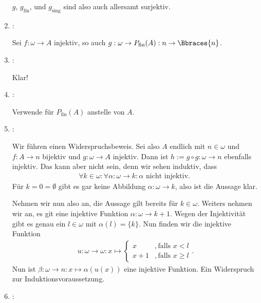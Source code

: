 \begin{solution}
\begin{enumerate}[label = \texttt{ad}]
	$g$, $g_\mathrm{fin}$, und $g_\mathrm{sing}$ sind also auch allersamt surjektiv.
	
	\item {}:
	
	Sei $f: \omega \to A$ injektiv, so auch $g: \omega \to P_\mathrm{fin}(A): n \to \Bbraces{n}$.
	
	\item {}:
	
	Klar!
	
	\item {}:
	
	Verwende  für $P_\mathrm{fin}(A)$ anstelle von $A$.
	
	\item {}:
	
	Wir führen einen Widerspruchsbeweis. Sei also $A$ endlich mit $n \in \omega$ und $f: A \to n$ bijektiv und $g: \omega \to A$ injektiv. Dann ist $h:= g \circ g: \omega \to n$ ebenfalls injektiv. Das kann aber nicht sein, denn wir sehen induktiv, dass
	\begin{align*}
		\forall k \in \omega: \forall \alpha: \omega \to k: \alpha \text{ nicht injektiv. }
	\end{align*}
	Für $k = 0 = \emptyset$ gibt es gar keine Abbildung $\alpha: \omega \to k$, also ist die Aussage klar.
	
	Nehmen wir nun also an, die Aussage gilt bereits für $k \in \omega$. Weiters nehmen wir an, es git eine injektive Funktion $\alpha: \omega \to k + 1$. Wegen der Injektivität gibt es genau ein $l \in \omega$ mit $\alpha(l) = \{k\}$. Nun finden wir die injektive Funktion 
	\begin{align*}
		u: \omega \to \omega: x \mapsto
		\begin{cases}
			x &, \text{falls } x < l \\
			x + 1 &, \text{falls } x \geq l
		\end{cases}.
	\end{align*}
	Nun ist $\beta: \omega \to n: x \mapsto \alpha(u(x))$ eine injektive Funktion. Ein Widerspruch zur Induktionsvoraussetzung. 
	
	\item {}:
	

\end{enumerate}
\end{solution}
